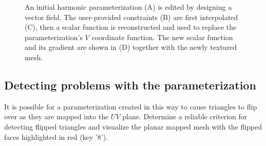 \documentclass[11pt]{amsart}
\begin{document}
\begin{figure}[h!]
   \centering
\hspace{.2cm}
\hspace{.2cm}
\hspace{.2cm}
   \caption{An initial harmonic parameterization (A) is edited by designing a
    vector field. The user-provided constraints (B) are first interpolated (C),
    then a scalar function is reconstructed and used to replace the
    parameterization's $V$ coordinate function. The new scalar function and its
    gradient are shown in (D) together with the newly textured mesh.\vspace{-5mm}}
   \label{fig:paramedit}
\end{figure}

\subsection {Detecting problems with the parameterization}
It is possible for a parameterization created in this way to cause triangles to
flip over as they are mapped into the $UV$ plane. Determine a reliable
criterion for detecting flipped triangles and visualize the planar mapped mesh
with the flipped faces highlighted in red (key '8'). 
\end{document}
